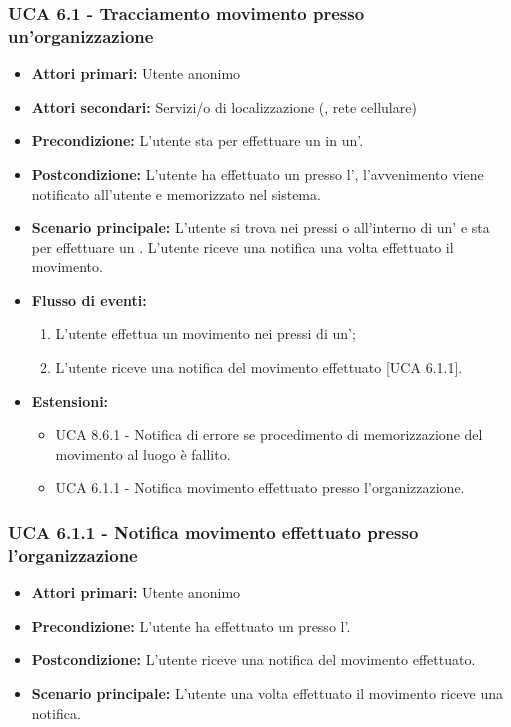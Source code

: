 \subsubsection{UCA 6.1 - Tracciamento movimento presso un'organizzazione}
\begin{itemize}
	\item \textbf{Attori primari:} Utente anonimo
	\item \textbf{Attori secondari:} Servizi/o di localizzazione (, rete cellulare)
	\item \textbf{Precondizione:} L'utente sta per effettuare un  in un'.
	\item \textbf{Postcondizione:} L'utente ha effettuato un  presso l', l'avvenimento viene notificato all'utente e memorizzato nel sistema. 
	\item \textbf{Scenario principale:} L'utente si trova nei pressi o all'interno di un' e sta per effettuare un . L'utente riceve una notifica una volta effettuato il movimento.
	\item \textbf{Flusso di eventi:}
	\begin{enumerate}
		\item L'utente effettua un movimento nei pressi di un';
		\item L'utente riceve una notifica del movimento effettuato [UCA 6.1.1].
	\end{enumerate}
	\item \textbf{Estensioni:}
	\begin{itemize}
		\item UCA 8.6.1 - Notifica di errore se procedimento di memorizzazione del movimento al luogo è fallito.
		\item UCA 6.1.1 - Notifica movimento effettuato presso l'organizzazione.
	\end{itemize}
\end{itemize}

\subsubsection{UCA 6.1.1 - Notifica movimento effettuato presso l'organizzazione}
\begin{itemize}
	\item \textbf{Attori primari:} Utente anonimo
	\item \textbf{Precondizione:} L'utente ha effettuato un  presso l'.
	\item \textbf{Postcondizione:} L'utente riceve una notifica del movimento effettuato.
	\item \textbf{Scenario principale:} L'utente una volta effettuato il movimento riceve una notifica.	
\end{itemize}

